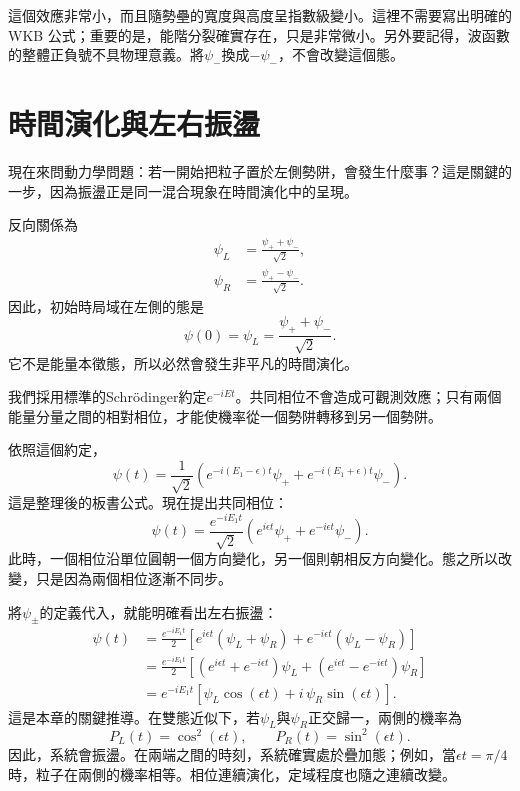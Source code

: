 這個效應非常小，而且隨勢壘的寬度與高度呈指數級變小。這裡不需要寫出明確的 WKB 公式；重要的是，能階分裂確實存在，只是非常微小。另外要記得，波函數的整體正負號不具物理意義。將\(\psi_-\)換成\(-\psi_-\)，不會改變這個態。

\section{時間演化與左右振盪}

現在來問動力學問題：若一開始把粒子置於左側勢阱，會發生什麼事？這是關鍵的一步，因為振盪正是同一混合現象在時間演化中的呈現。

反向關係為
\begin{align}
\psi_L &= \frac{\psi_+ + \psi_-}{\sqrt{2}},\\
\psi_R &= \frac{\psi_+ - \psi_-}{\sqrt{2}}.
\end{align}
因此，初始時局域在左側的態是
\begin{equation}
\psi(0)=\psi_L=\frac{\psi_+ + \psi_-}{\sqrt{2}}.
\end{equation}
它不是能量本徵態，所以必然會發生非平凡的時間演化。

我們採用標準的Schr\"odinger約定\(e^{-iEt}\)。共同相位不會造成可觀測效應；只有兩個能量分量之間的相對相位，才能使機率從一個勢阱轉移到另一個勢阱。

依照這個約定，
\begin{equation}
\psi(t)=\frac{1}{\sqrt{2}}\left(e^{-i(E_1-\epsilon)t}\psi_+ + e^{-i(E_1+\epsilon)t}\psi_-\right).
\end{equation}
這是整理後的板書公式。現在提出共同相位：
\begin{equation}
\psi(t)=\frac{e^{-iE_1 t}}{\sqrt{2}}\left(e^{i\epsilon t}\psi_+ + e^{-i\epsilon t}\psi_-\right).
\end{equation}
此時，一個相位沿單位圓朝一個方向變化，另一個則朝相反方向變化。態之所以改變，只是因為兩個相位逐漸不同步。

將\(\psi_\pm\)的定義代入，就能明確看出左右振盪：
\begin{align}
\psi(t)
&= \frac{e^{-iE_1 t}}{2}
\left[e^{i\epsilon t}(\psi_L+\psi_R)+e^{-i\epsilon t}(\psi_L-\psi_R)\right] \\
&= \frac{e^{-iE_1 t}}{2}
\left[(e^{i\epsilon t}+e^{-i\epsilon t})\psi_L+(e^{i\epsilon t}-e^{-i\epsilon t})\psi_R\right] \\
&= e^{-iE_1 t}\left[\psi_L\cos(\epsilon t)+i\,\psi_R\sin(\epsilon t)\right].
\end{align}
這是本章的關鍵推導。在雙態近似下，若\(\psi_L\)與\(\psi_R\)正交歸一，兩側的機率為
\begin{equation}
P_L(t)=\cos^2(\epsilon t),
\qquad
P_R(t)=\sin^2(\epsilon t).
\end{equation}
因此，系統會振盪。在兩端之間的時刻，系統確實處於疊加態；例如，當\(\epsilon t=\pi/4\)時，粒子在兩側的機率相等。相位連續演化，定域程度也隨之連續改變。

